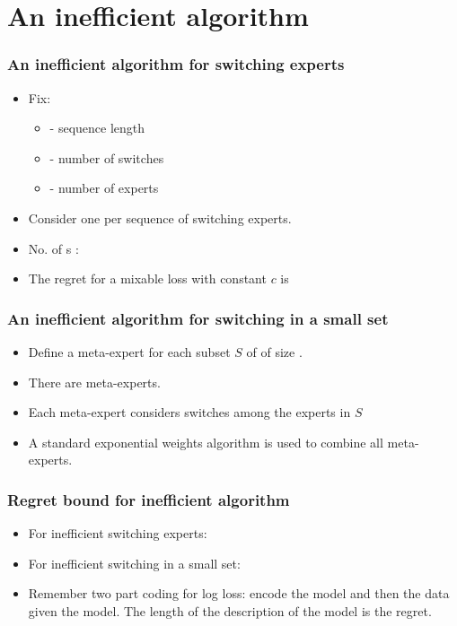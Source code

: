 \documentclass{beamer}
\begin{document}
\section{An inefficient algorithm}

\begin{frame}
\frametitle{An inefficient algorithm for switching experts}
\begin{itemize}
\item Fix:
\begin{itemize}
\item {} - sequence length
\item {} - number of switches
\item {} - number of experts
\end{itemize}
\item Consider one  per sequence of switching experts.
\item No. of s : 
\item The regret for a mixable loss with constant $c$ is
\end{itemize}
\end{frame}

\begin{frame}
\frametitle{An inefficient algorithm for switching in a small set}
\begin{itemize}
\item Define a meta-expert for each subset $S$ of  of size
  .
\item There are  meta-experts.
\item Each meta-expert considers switches among the experts in $S$
\item A standard exponential weights algorithm is used to combine all
  meta-experts.
\end{itemize}
\end{frame}

\begin{frame}
\frametitle{Regret bound for inefficient algorithm}
\begin{itemize}
\item For inefficient switching experts:\\
\item For inefficient switching in a small set:\\
\item Remember two part coding for log loss: encode the model and
  then the data given the model. The length of the description of
  the model is the regret.
\end{itemize}
\end{frame}
\end{document}
